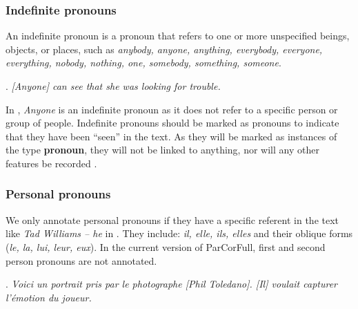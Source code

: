 \documentclass[a4paper]{article}
\begin{document}
{{\subsubsection{Indefinite pronouns}

An indefinite pronoun is a pronoun that refers to one or more unspecified beings, objects, or places, such as {\sl anybody, anyone, anything, everybody, everyone, everything, nobody, nothing, one, somebody, something, someone}.

\ex. {\sl [Anyone] can see that she was looking for trouble.}

In \Last, {\sl Anyone} is an indefinite pronoun as it does not refer to a specific person or group of people. Indefinite pronouns should be marked as pronouns to indicate that they have been ``seen'' in the text. As they will be marked as instances of the type {\bf pronoun}, they will not be linked to anything, nor will any other features be recorded \cite[p. 9]{GuillouEtAlGuide}.

\subsubsection{Personal pronouns}

We only annotate personal pronouns if they have a specific referent in the text like {\sl Tad Williams -- he} in \Next. %
They include: \textsl{il, elle, ils, elles} and their oblique forms
({\sl le, la, lui, leur, eux}). In the current version of ParCorFull, first and
second person pronouns are not annotated.

\ex.
\textsl{Voici un portrait pris par le photographe [Phil Toledano]. [Il] voulait
capturer l'émotion du joueur.}

}}
\end{document}
